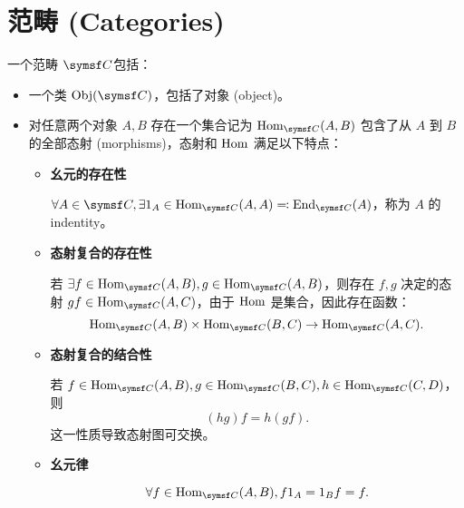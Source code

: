 \section{范畴 (Categories)}



一个范畴 \(\symsf C\)包括：
\begin{itemize}
    \item 一个类 \(\Obj(\symsf C)\)，包括了对象 (object)。
    \item 对任意两个对象 \(A,B\) 存在一个集合记为 \(\Hom_{\symsf C}(A,B)\) 包含了从 \(A\) 到 \(B\) 的全部态射 (morphisms)，态射和 \(\operatorname{Hom}\) 满足以下特点：
          \begin{itemize}
              \item \textbf{幺元的存在性}

                    \(\forall A\in \symsf C,\exists 1_A \in \Hom_{\symsf C}(A,A) \eqcolon \End_{\symsf C}(A)\)，称为 \(A\) 的 indentity。
              \item \textbf{态射复合的存在性}

                    若 \(\exists f\in \Hom_{\symsf C}(A,B), g\in \Hom_{\symsf C}(A,B)\)，则存在 \(f,g\) 决定的态射 \(gf\in \Hom_{\symsf C}(A,C)\)，由于 \(\operatorname{Hom}\) 是集合，因此存在函数：
                    \[
                        \Hom_{\symsf C}(A,B) \times \Hom_{\symsf C}(B,C) \to \Hom_{\symsf C}(A,C)
                        .\]
              \item \textbf{态射复合的结合性}

                    若 \(f\in \Hom_{\symsf C}(A,B), g\in \Hom_{\symsf C}(B,C), h\in \Hom_{\symsf C}(C,D)\)，则
                    \[
                        (hg)f = h(gf)
                        .\]
                    这一性质导致态射图可交换。
              \item \textbf{幺元律}

                    \[
                        \forall f\in \Hom_{\symsf C}(A,B),f 1_A = 1_Bf=f
                        .\]
          \end{itemize}
\end{itemize}

